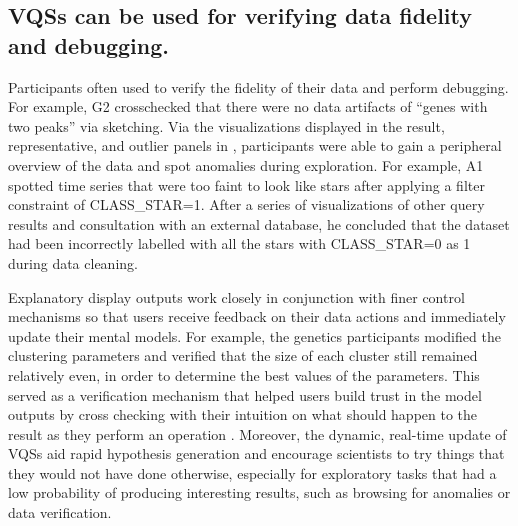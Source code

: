 \subsection{VQSs can be used for verifying data fidelity and debugging.}
\par Participants often used \zv to verify the fidelity of their data and perform debugging. For example, G2 crosschecked that there were no data artifacts of ``genes with two peaks'' via sketching.  Via the visualizations displayed in the result, representative, and outlier panels in \zv, participants were able to gain a peripheral overview of the data and spot anomalies during exploration. For example, A1 spotted time series that were too faint to look like stars after applying a filter constraint of CLASS\_STAR=1. After a series of visualizations of other query results and consultation with an external database, he concluded that the dataset had been incorrectly labelled with all the stars with CLASS\_STAR=0 as 1 during data cleaning. 
\par Explanatory display outputs  work closely in conjunction with finer control mechanisms so that users receive feedback on their data actions and immediately update their mental models. For example, the genetics participants modified the clustering parameters and verified that the size of each cluster still remained relatively even, in order to determine the best values of the parameters. This served as a verification mechanism that helped users build trust in the model outputs by cross checking with their intuition on what should happen to the result as they perform an operation \cite{Chuang2012}. Moreover, the dynamic, real-time update of VQSs aid rapid hypothesis generation and encourage scientists to try things that they would not have done otherwise, especially for exploratory tasks that had a low probability of producing interesting results, such as browsing for anomalies  or data verification. 
